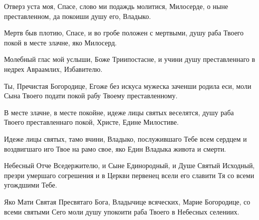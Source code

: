 \begin{mymulticols}
\vspace{\baselineskip}



Отверз уста моя, Спасе, слово ми подаждь молитися, Милосерде, о ныне преставленном, да покоиши душу его, Владыко.


Мертв быв плотию, Спасе, и во гробе положен с мертвыми, душу раба Твоего покой в месте злачне, яко Милосерд.

\slava

Молебный глас мой услыши, Боже Триипостасне, и учини душу преставленнаго в недрех Авраамлих, Избавителю.

\inyne

Ты, Пречистая Богородице, Егоже без искуса мужеска заченши родила еси, моли Сына Твоего подати покой рабу Твоему преставленному. 

\vspace{\baselineskip}



В месте злачне, в месте покойне, идеже лицы святых веселятся, душу раба Твоего преставленнаго покой, Христе, Едине Милостиве.


Идеже лицы святых, тамо вчини, Владыко, послужившаго Тебе всем сердцем и воздвигшаго иго Твое на рамо свое, яко Един Владыка живота и смерти. 

\slava

Небесный Отче Вседержителю, и Сыне Единородный, и Душе Святый Исходный, презри умершаго согрешения и в Церкви первенец всели его славити Тя со всеми угождшими Тебе. 

\inyne

Яко Мати Святая Пресвятаго Бога, Владычице всяческих, Марие Богородице, со всеми святыми Сего моли душу упокоити раба Твоего в Небесных селениих.

\vspace{\baselineskip}


\end{mymulticols}
